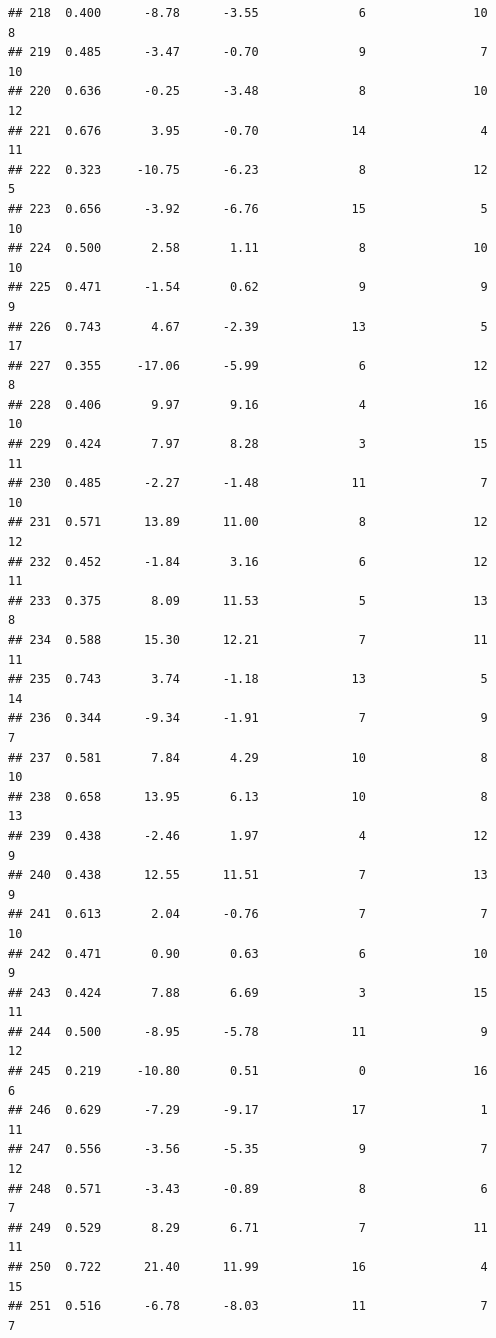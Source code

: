 \documentclass[]{book}
\begin{document}
\begin{verbatim}
## 218  0.400      -8.78      -3.55              6               10        8
## 219  0.485      -3.47      -0.70              9                7       10
## 220  0.636      -0.25      -3.48              8               10       12
## 221  0.676       3.95      -0.70             14                4       11
## 222  0.323     -10.75      -6.23              8               12        5
## 223  0.656      -3.92      -6.76             15                5       10
## 224  0.500       2.58       1.11              8               10       10
## 225  0.471      -1.54       0.62              9                9        9
## 226  0.743       4.67      -2.39             13                5       17
## 227  0.355     -17.06      -5.99              6               12        8
## 228  0.406       9.97       9.16              4               16       10
## 229  0.424       7.97       8.28              3               15       11
## 230  0.485      -2.27      -1.48             11                7       10
## 231  0.571      13.89      11.00              8               12       12
## 232  0.452      -1.84       3.16              6               12       11
## 233  0.375       8.09      11.53              5               13        8
## 234  0.588      15.30      12.21              7               11       11
## 235  0.743       3.74      -1.18             13                5       14
## 236  0.344      -9.34      -1.91              7                9        7
## 237  0.581       7.84       4.29             10                8       10
## 238  0.658      13.95       6.13             10                8       13
## 239  0.438      -2.46       1.97              4               12        9
## 240  0.438      12.55      11.51              7               13        9
## 241  0.613       2.04      -0.76              7                7       10
## 242  0.471       0.90       0.63              6               10        9
## 243  0.424       7.88       6.69              3               15       11
## 244  0.500      -8.95      -5.78             11                9       12
## 245  0.219     -10.80       0.51              0               16        6
## 246  0.629      -7.29      -9.17             17                1       11
## 247  0.556      -3.56      -5.35              9                7       12
## 248  0.571      -3.43      -0.89              8                6        7
## 249  0.529       8.29       6.71              7               11       11
## 250  0.722      21.40      11.99             16                4       15
## 251  0.516      -6.78      -8.03             11                7        7

\end{verbatim}
\end{document}
